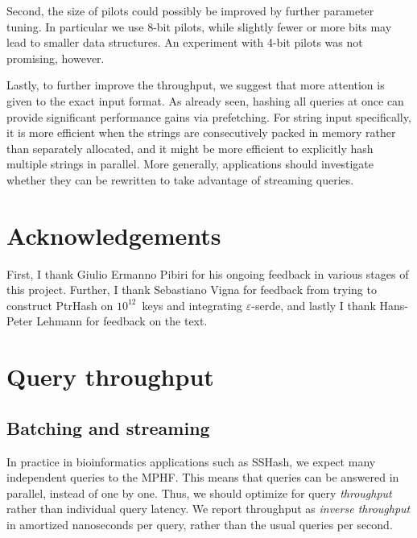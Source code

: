 \documentclass[a4paper,UKenglish,cleveref,thm-restate]{lipics-v2021}
\begin{document}
Second, the size of pilots could possibly be improved by further parameter
tuning. In particular we use 8-bit pilots, while slightly fewer or more
bits may lead to smaller data structures. An experiment with 4-bit pilots
was not promising, however.

Lastly, to further improve the throughput, we suggest that more attention is
given to the exact input format. As already seen, hashing all queries at once
can provide significant performance gains via prefetching.  For string input
specifically, it is more efficient when the strings are consecutively packed in memory
rather than separately allocated, and it might be more efficient to explicitly
hash multiple strings in parallel.
More generally, applications should investigate whether they can be rewritten to take
advantage of streaming queries.
\section*{Acknowledgements}
\label{sec:orgbb6ba66}
First, I thank Giulio Ermanno Pibiri for his ongoing feedback in
various stages of this project. Further, I thank Sebastiano Vigna for feedback
from trying to construct PtrHash on \(10^{12}\)~keys and integrating
$\varepsilon$-serde, and lastly I thank Hans-Peter Lehmann for feedback on the text.




\newpage
\clearpage
\appendix

\section{Query throughput}
\label{sec:throughput}
\subsection{Batching and streaming}
\label{sec:orgcf2c161}
In practice in bioinformatics applications such as SSHash, we expect many
independent queries to the MPHF. This means that queries can be answered in
parallel, instead of one by one. Thus, we should optimize for query \emph{throughput}
rather than individual query latency. We report throughput as \emph{inverse
throughput} in amortized nanoseconds per query, rather than the usual queries
per second.
\end{document}
